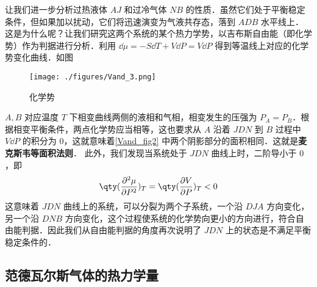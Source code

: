 让我们进一步分析过热液体 $AJ$ 和过冷气体 $NB$ 的性质．虽然它们处于平衡稳定条件，但如果加以扰动，它们将迅速演变为气液共存态，落到 $ADB$ 水平线上．这是为什么呢？让我们研究这两个系统的某个热力学势，以吉布斯自由能（即化学势）作为判据进行分析．利用 $\dd \mu=-S\dd T+V\dd P=V\dd P$ 得到等温线上对应的化学势变化曲线．如图

\begin{figure}[ht]
\centering
\texttt{[image: ./figures/Vand\_3.png]}
\caption{化学势} \label{Vand_fig3}
\end{figure}
$A,B$ 对应温度 $T$ 下相变曲线两侧的液相和气相，相变发生的压强为 $P_A=P_B$．根据相变平衡条件，两点化学势应当相等，这也要求从 $A$ 沿着 $JDN$ 到 $B$ 过程中 $V\dd P$ 的积分为 $0$，这就意味着\autoref{Vand_fig2} 中两个阴影部分的面积相同．这就是\textbf{麦克斯韦等面积法则}．
此外，我们发现当系统处于 $JDN$ 曲线上时，二阶导小于 $0$，即
\begin{equation}
\qty(\frac{\partial^2 \mu}{\partial P^2})_T=
\qty(\frac{\partial V}{\partial P})_T < 0
\end{equation}
这意味着 $JDN$ 曲线上的系统，可以分裂为两个子系统，一个沿 $DJA$ 方向变化，另一个沿 $DNB$ 方向变化，这个过程使系统的化学势向更小的方向进行，符合自由能判据．因此我们从自由能判据的角度再次说明了 $JDN$ 上的状态是不满足平衡稳定条件的．



\subsection{范德瓦尔斯气体的热力学量}
